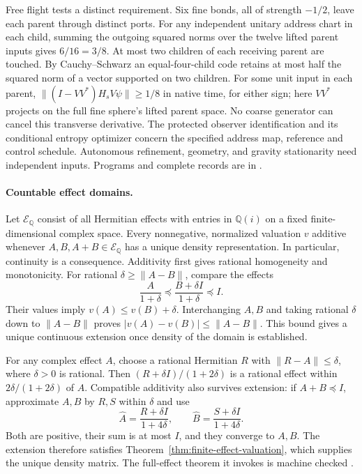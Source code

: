 \documentclass[11pt]{article}
\begin{document}
Free flight tests a distinct requirement. Six fine bonds, all of strength
\(-1/2\), leave each parent through distinct ports. For any independent
unitary address chart in each child, summing the outgoing squared norms
over the twelve lifted parent inputs gives \(6/16=3/8\). At most two
children of each receiving parent are touched. By Cauchy--Schwarz an
equal-four-child code retains at most half the squared norm of a vector
supported on two children. For some unit input in each parent,
\(\|(I-VV^*)H_sV\psi\|\ge1/8\) in native time, for either sign; here
\(VV^*\) projects on the full fine sphere's lifted parent space.
No coarse generator can cancel this transverse derivative. The protected
observer identification and its conditional entropy optimizer concern the
specified address map, reference and control schedule. Autonomous
refinement, geometry, and gravity stationarity need independent inputs.
Programs and complete records are in
.

\paragraph{Countable effect domains.}
Let $\mathcal E_{\mathbb Q}$ consist of all Hermitian effects with entries in
$\mathbb Q(i)$ on a fixed finite-dimensional complex space. Every nonnegative,
normalized valuation $v$ additive whenever $A,B,A+B\in\mathcal E_{\mathbb Q}$
has a unique density representation. In particular, continuity is a consequence.
Additivity first gives rational homogeneity and monotonicity. For rational
$\delta\geq\|A-B\|$, compare the effects
\[
 \frac{A}{1+\delta}\preceq\frac{B+\delta I}{1+\delta}\preceq I.
\]
Their values imply $v(A)\leq v(B)+\delta$. Interchanging $A,B$ and taking
rational $\delta$ down to $\|A-B\|$ proves
$|v(A)-v(B)|\leq\|A-B\|$. This bound gives a unique continuous extension
once density of the domain is established.

For any complex effect $A$, choose a rational Hermitian $R$ with
$\|R-A\|\leq\delta$, where $\delta>0$ is rational. Then
$(R+\delta I)/(1+2\delta)$ is a rational effect within
$2\delta/(1+2\delta)$ of $A$. Compatible additivity also survives extension:
if $A+B\preceq I$, approximate $A,B$ by $R,S$ within $\delta$ and use
\[
 \widehat A=\frac{R+\delta I}{1+4\delta},\qquad
 \widehat B=\frac{S+\delta I}{1+4\delta}.
\]
Both are positive, their sum is at most $I$, and they converge to $A,B$.
The extension therefore satisfies Theorem~\ref{thm:finite-effect-valuation},
which supplies the unique density matrix. The full-effect theorem it invokes
is machine checked \cite{ophrepo}.
\end{document}
